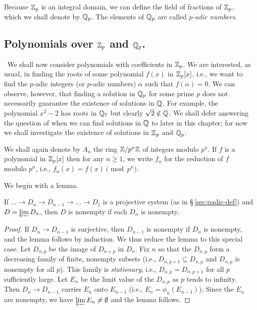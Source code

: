 Because \(\mathbb{Z}_p\) is an integral domain, we can define the field of fractions of \(\mathbb{Z}_p\), which we shall denote by \(\mathbb{Q}_p\). The elements of \(\mathbb{Q}_p\) are called \emph{\(p\)-adic numbers}.

\subsection{Polynomials over \(\mathbb{Z}_p\) and \(\mathbb{Q}_p\).}~We shall now consider polynomials with coefficients in \(\mathbb{Z}_p\). We are interested, as usual, in finding the roots of some polynomial \(f(x)\) in \(\mathbb{Z}_p[x]\), i.e., we want to find the \(p\)-adic integers (or \(p\)-adic numbers) \(\alpha\) such that \(f(\alpha) = 0\). We can observe, however, that finding a solution in \(\mathbb{Q}_p\) for some prime \(p\) does not necessarily guarantee the existence of solutions in \(\mathbb{Q}\). For example, the polynomial \(x^2 - 2\) has roots in \(\mathbb{Q}_7\) but clearly \(\sqrt{2} \notin \mathbb{Q}\). We shall defer answering the question of when we can find solutions in \(\mathbb{Q}\) to later in this chapter; for now we shall investigate the existence of solutions in \(\mathbb{Z}_p\) and \(\mathbb{Q}_p\).\label{sec:polynomials-over-zp}

We shall again denote by \(A_n\) the ring \(\mathbb{Z} / p^n \mathbb{Z}\) of integers modulo \(p^n\). If \(f\) is a polynomial in \(\mathbb{Z}_p[x]\) then for any \(n \geq 1\), we write \(f_n\) for the reduction of \(f\) modulo \(p^n\), i.e., \(f_n(x) = f(x) \pmod{p^n}\).

We begin with a lemma.

\begin{lemma}
    {\normalfont\cite[p.~13]{serre2012course}}
    If \(\dots \to D_n \to D_{n - 1} \to \dots \to D_1\) is a projective system (as in {\normalfont \S\,\ref{sec:padic-def}}) and \(D = \varprojlim D_n\), then \(D\) is nonempty if each \(D_n\) is nonempty.
\end{lemma}

\begin{proof}
    If \(D_n \to D_{n-1}\) is surjective, then \(D_{n-1}\) is nonempty if \(D_n\) is nonempty, and the lemma follows by induction. We thus reduce the lemma to this special case. Let \(D_{n, p}\) be the image of \(D_{n+p}\) in \(D_n\). Fix \(n\) so that the \(D_{n,p}\) form a decreasing family of finite, nonempty subsets (i.e., \(D_{n,p+1} \subseteq D_{n,p}\) and \(D_{n,p}\) is nonempty for all \(p\)). This family is \emph{stationary}, i.e., \(D_{n,p} = D_{n,p+1}\) for all \(p\) sufficiently large. Let \(E_n\) be the limit value of the \(D_{n,p}\) as \(p\) tends to infinity. Then \(D_n \to D_{n-1}\) carries \(E_n\) onto \(E_{n-1}\) (i.e., \(E_n = \phi_n(E_{n-1})\)). Since the \(E_n\) are nonempty, we have \(\varprojlim E_n \neq \emptyset\) and the lemma follows.
\end{proof}

